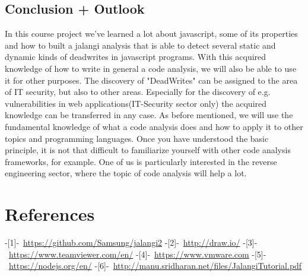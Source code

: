 \documentclass[a4paper]{scrartcl}
\begin{document}
\subsection{Conclusion + Outlook}
In this course project we've learned a lot about javascript, some of its properties and how to built a jalangi analysis that is able to detect several static and dynamic kinds of deadwrites in javascript programs. With this acquired knowledge of how to write in general a code analysis, we will also be able to use it for other purposes. The discovery of "DeadWrites" can be assigned to the area of IT security, but also to other areas. Especially for the discovery of e.g. vulnerabilities in web applications(IT-Security sector only) the acquired knowledge can be transferred in any case. As before mentioned, we will use the fundamental knowledge of what a code analysis does and how to apply it to other topics and programming languages. Once you have understood the basic principle, it is not that difficult to familiarize yourself with other code analysis frameworks, for example. One of us is particularly interested in the reverse engineering sector, where the topic of code analysis will help a lot.
\newpage
\section{References}
\mbox{-[1]- \url{https://github.com/Samsung/jalangi2}}
\newline
\mbox{-[2]- \url{http://draw.io/}}
\newline
\mbox{-[3]- \url{https://www.teamviewer.com/en/}}
\newline
\mbox{-[4]- \url{https://www.vmware.com}}
\newline
\mbox{-[5]- \url{https://nodejs.org/en/}}
\newline
\mbox{-[6]- \url{http://manu.sridharan.net/files/JalangiTutorial.pdf}}
\end{document}
